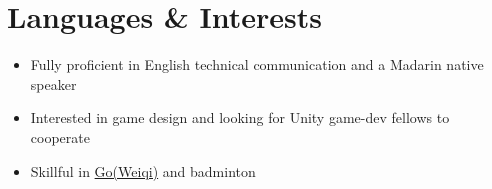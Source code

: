 \documentclass[letterpaper,10pt]{article}
\begin{document}
    \section{\faSoccerBallO Languages \& Interests}
    \begin{itemize}
      \item Fully proficient in English technical communication and a Madarin native speaker
      \item Interested in game design and looking for Unity game-dev fellows to cooperate
      \item Skillful in \href{https://en.wikipedia.org/wiki/Go_(game)}{Go(Weiqi)} and badminton
    \end{itemize}

    
\end{document}
